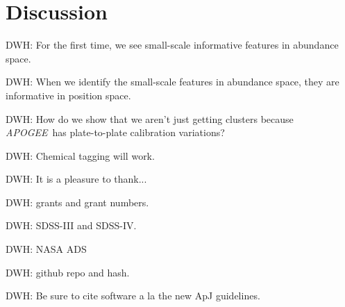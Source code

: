 \documentclass[12pt, letterpaper, preprint]{aastex}
\newcommand{\acronym}[1]{{\small{#1}}}
\newcommand{\project}[1]{\textsl{#1}}
\newcommand{\apogee}{\acronym{\project{APOGEE}}}
\begin{document}
\section{Discussion}

DWH: For the first time, we see small-scale informative features in abundance space.

DWH: When we identify the small-scale features in abundance space, they are informative in position space.

DWH: How do we show that we aren't just getting clusters because \apogee\ has plate-to-plate calibration variations?

DWH: Chemical tagging will work.

\acknowledgements
DWH: It is a pleasure to thank...

DWH: grants and grant numbers.

DWH: SDSS-III and SDSS-IV.

DWH: NASA ADS

DWH: github repo and hash.

DWH: Be sure to cite software a la the new ApJ guidelines.
\end{document}

